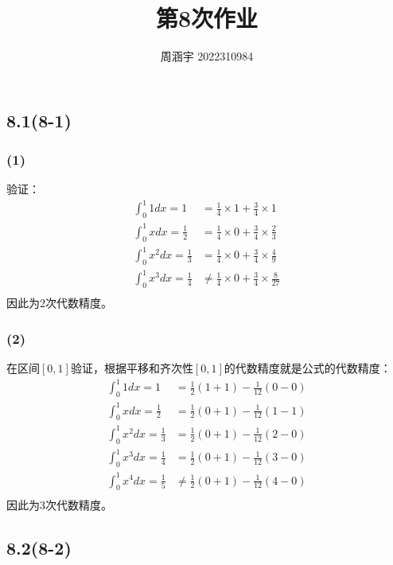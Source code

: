 \documentclass[UTF8,zihao=5]{ctexart}
\title{{\bfseries 第8次作业}}
\author{周涵宇 2022310984}
\date{}
\begin{document}
\maketitle

\subsection*{8.1(8-1)}

\subsubsection*{(1)}

验证：
$$
    \begin{aligned}
        \int_0^1{1dx}=1             & =\frac{1}{4}\times 1 + \frac{3}{4}\times 1               \\
        \int_0^1{xdx}=\frac{1}{2}   & =\frac{1}{4}\times 0 + \frac{3}{4}\times \frac{2}{3}     \\
        \int_0^1{x^2dx}=\frac{1}{3} & =\frac{1}{4}\times 0 + \frac{3}{4}\times \frac{4}{9}     \\
        \int_0^1{x^3dx}=\frac{1}{4} & \neq\frac{1}{4}\times 0 + \frac{3}{4}\times \frac{8}{27} \\
    \end{aligned}
$$
因此为2次代数精度。

\subsubsection*{(2)}

在区间$[0,1]$验证，根据平移和齐次性$[0,1]$的代数精度就是公式的代数精度：
$$
    \begin{aligned}
        \int_0^1{1dx}= 1            & =\frac{1}{2}(1+1) - \frac{1}{12}(0 - 0)    \\
        \int_0^1{xdx}= \frac{1}{2}  & =\frac{1}{2}(0+1) - \frac{1}{12}(1 - 1)    \\
        \int_0^1{x^2dx}=\frac{1}{3} & =\frac{1}{2}(0+1) - \frac{1}{12}(2 - 0)    \\
        \int_0^1{x^3dx}=\frac{1}{4} & =\frac{1}{2}(0+1) - \frac{1}{12}(3 - 0)    \\
        \int_0^1{x^4dx}=\frac{1}{5} & \neq\frac{1}{2}(0+1) - \frac{1}{12}(4 - 0) \\
    \end{aligned}
$$
因此为3次代数精度。

\subsection*{8.2(8-2)}
\end{document}
